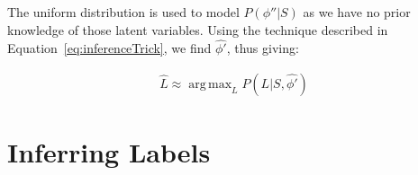\documentclass[12pt,a4paper,twoside,openright]{report}
\DeclareMathOperator*{\argmax}{arg\,max}
\theoremstyle{definition}
\begin{document}
The uniform distribution is used to model $P(\phi''|S)$ as we have no prior knowledge of those latent variables. 
Using the technique described in Equation~\ref{eq:inferenceTrick}, we find $\hat{\phi'}$, thus giving: 

\begin{equation}
  \begin{aligned}
    \hat L \approx \argmax_L P(L | S, \hat{\phi'})
  \end{aligned}
  \label{eq:aceProbSolLatent}
\end{equation}









\section{Inferring Labels}
\end{document}
